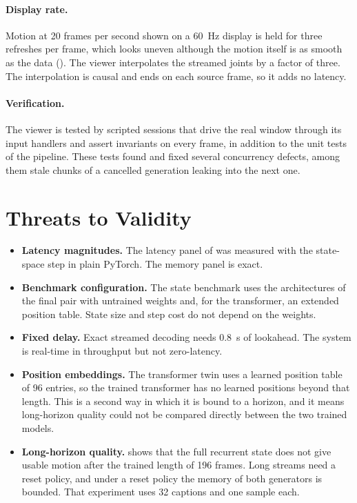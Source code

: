 \paragraph{Display rate.} Motion at 20 frames per second shown on a 60~Hz display is held for three refreshes per frame, which looks uneven although the motion itself is as smooth as the data (). The viewer interpolates the streamed joints by a factor of three. The interpolation is causal and ends on each source frame, so it adds no latency.

\paragraph{Verification.} The viewer is tested by scripted sessions that drive the real window through its input handlers and assert invariants on every frame, in addition to the unit tests of the pipeline. These tests found and fixed several concurrency defects, among them stale chunks of a cancelled generation leaking into the next one.

\section{Threats to Validity}
\label{sec:stream_threats}

\begin{itemize}
\item \textbf{Latency magnitudes.} The latency panel of  was measured with the state-space step in plain PyTorch. The memory panel is exact.
\item \textbf{Benchmark configuration.} The state benchmark uses the architectures of the final pair with untrained weights and, for the transformer, an extended position table. State size and step cost do not depend on the weights.
\item \textbf{Fixed delay.} Exact streamed decoding needs $0.8$~s of lookahead. The system is real-time in throughput but not zero-latency.
\item \textbf{Position embeddings.} The transformer twin uses a learned position table of 96 entries, so the trained transformer has no learned positions beyond that length. This is a second way in which it is bound to a horizon, and it means long-horizon quality could not be compared directly between the two trained models.
\item \textbf{Long-horizon quality.}  shows that the full recurrent state does not give usable motion after the trained length of 196 frames. Long streams need a reset policy, and under a reset policy the memory of both generators is bounded. That experiment uses 32 captions and one sample each.
\end{itemize}

